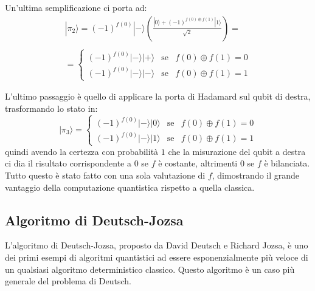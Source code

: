 Un'ultima semplificazione ci porta ad:
\begin{equation*}
    \begin{array}{c}
        |\pi_2\rangle = (-1)^{f(0)}|-\rangle\left(\frac{|0\rangle + (-1)^{f(0)\oplus f(1)} |1\rangle}{\sqrt{2}}\right) = \\ \\
        = \left\{ \begin{array}{rcl}
            (-1)^{f(0)}|-\rangle|+\rangle & \text{se} & f(0) \oplus f(1) = 0 \\
            (-1)^{f(0)}|-\rangle|-\rangle & \text{se} & f(0) \oplus f(1) = 1
        \end{array}\right.
    \end{array}
\end{equation*}

L'ultimo passaggio è quello di applicare la porta di Hadamard sul qubit di destra, trasformando lo stato in:
\begin{equation*}
    |\pi_3\rangle = \left\{ \begin{array}{rcl}
        (-1)^{f(0)}|-\rangle|0\rangle & \text{se} & f(0) \oplus f(1) = 0 \\
        (-1)^{f(0)}|-\rangle|1\rangle & \text{se} & f(0) \oplus f(1) = 1
    \end{array}\right.
\end{equation*}
quindi avendo la certezza con probabilità $1$ che la misurazione del qubit a destra ci dia il risultato
corrispondente a $0$ se $f$ è costante, altrimenti $0$ se $f$ è bilanciata. Tutto questo è stato
fatto con una sola valutazione di $f$, dimostrando il grande vantaggio della computazione quantistica
rispetto a quella classica.

\subsection{Algoritmo di Deutsch-Jozsa}
L'algoritmo di Deutsch-Jozsa, proposto da David Deutsch e Richard Jozsa, è uno dei primi esempi di algoritmi
quantistici ad essere esponenzialmente più veloce di un qualsiasi algoritmo deterministico classico. Questo 
algoritmo è un caso più generale del problema di Deutsch.

